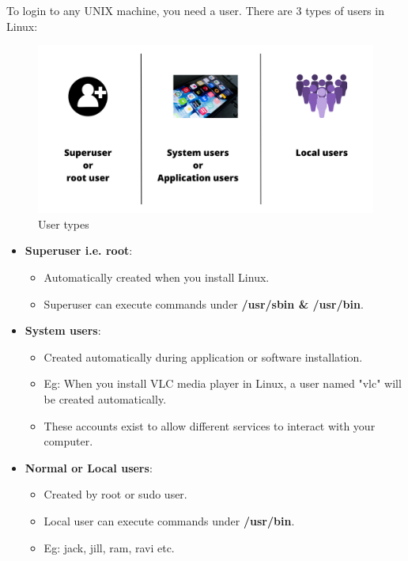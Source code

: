 \setlength{\columnsep}{3pt}
\begin{flushleft}
	\bigskip
	To login to any UNIX machine, you need a user. There are 3 types of users in Linux:

	\begin{figure}[h!]
		\centering
		\includegraphics[scale=0.20]{content/chapter4/images/users.png}
		\caption{User types}
		\label{fig:user}
	\end{figure}

	
	\begin{itemize}
		\item \textbf{Superuser i.e. root}: 
		\begin{itemize}
			\item Automatically created when you install Linux.
			\item Superuser can execute commands under \textbf{/usr/sbin \& /usr/bin}.
		\end{itemize}

		\item \textbf{System users}:
		\begin{itemize}
			\item Created automatically during application or software installation.
			\item Eg: When you install VLC media player in Linux, a user named "vlc" will be created automatically.
			\item These accounts exist to allow different services to interact with
			your computer.
		\end{itemize}
		
		\item \textbf{Normal or Local users}:
		\begin{itemize}
			\item Created by root or sudo user.
			\item Local user can execute commands under \textbf{/usr/bin}.
			\item Eg: jack, jill, ram, ravi etc.
		\end{itemize}
		
	\end{itemize}

\end{flushleft}

\newpage





